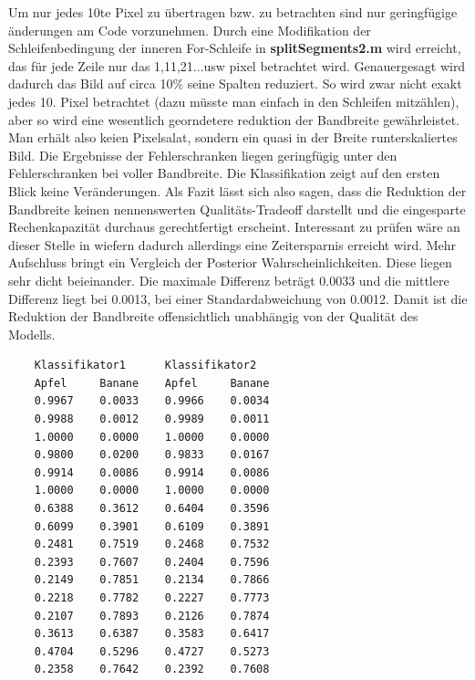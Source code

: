 \documentclass[a4paper,10pt]{article}
\begin{document}
Um nur jedes 10te Pixel zu übertragen bzw. zu betrachten sind nur geringfügige änderungen am Code vorzunehmen. Durch eine Modifikation der Schleifenbedingung der inneren
For-Schleife in \textbf{splitSegments2.m} wird erreicht, das für jede Zeile nur das 1,11,21...usw pixel betrachtet wird. Genauergesagt wird dadurch das Bild auf circa 
10\% seine Spalten reduziert. So wird zwar nicht exakt jedes 10. Pixel betrachtet (dazu müsste man einfach in den Schleifen mitzählen), aber so wird eine wesentlich
georndetere reduktion der Bandbreite gewährleistet. Man erhält also keien Pixelsalat, sondern ein quasi in der Breite runterskaliertes Bild.
\newline
Die Ergebnisse der Fehlerschranken liegen geringfügig unter den Fehlerschranken bei voller Bandbreite. Die Klassifikation zeigt auf den ersten Blick keine Veränderungen.
Als Fazit lässt sich also sagen, dass die Reduktion der Bandbreite keinen nennenswerten Qualitäts-Tradeoff darstellt und die eingesparte Rechenkapazität durchaus gerechtfertigt
erscheint. Interessant zu prüfen wäre an dieser Stelle in wiefern dadurch allerdings eine Zeitersparnis erreicht wird.
\newline
Mehr Aufschluss bringt ein Vergleich der Posterior Wahrscheinlichkeiten. Diese liegen sehr dicht beieinander. Die maximale Differenz beträgt 0.0033 und die mittlere
Differenz liegt bei 0.0013, bei einer Standardabweichung von 0.0012. Damit ist die Reduktion der Bandbreite offensichtlich unabhängig von der Qualität des Modells.
\begin{verbatim}
    Klassifikator1      Klassifikator2
    Apfel     Banane    Apfel     Banane
    0.9967    0.0033    0.9966    0.0034
    0.9988    0.0012    0.9989    0.0011
    1.0000    0.0000    1.0000    0.0000
    0.9800    0.0200    0.9833    0.0167
    0.9914    0.0086    0.9914    0.0086
    1.0000    0.0000    1.0000    0.0000
    0.6388    0.3612    0.6404    0.3596
    0.6099    0.3901    0.6109    0.3891
    0.2481    0.7519    0.2468    0.7532
    0.2393    0.7607    0.2404    0.7596
    0.2149    0.7851    0.2134    0.7866
    0.2218    0.7782    0.2227    0.7773
    0.2107    0.7893    0.2126    0.7874
    0.3613    0.6387    0.3583    0.6417
    0.4704    0.5296    0.4727    0.5273
    0.2358    0.7642    0.2392    0.7608
\end{verbatim}
\end{document}
